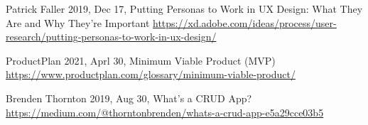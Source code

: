\begin{thebibliography}{9} 
    Patrick Faller
    2019, Dec 17,
    Putting Personas to Work in UX Design: What They Are and Why They’re Important
    \url{https://xd.adobe.com/ideas/process/user-research/putting-personas-to-work-in-ux-design/}

    ProductPlan
    2021, Aprl 30,
    Minimum Viable Product (MVP)
    \url{https://www.productplan.com/glossary/minimum-viable-product/}

    Brenden Thornton
    2019, Aug 30,
    What’s a CRUD App?
    \url{https://medium.com/@thorntonbrenden/whats-a-crud-app-e5a29cce03b5}
\end{thebibliography}

